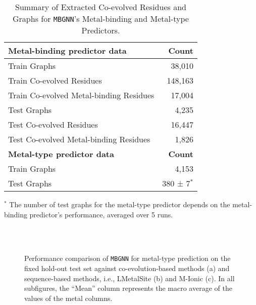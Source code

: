 \documentclass[letterpaper, 10 pt, conference]{ieeeconf}
\begin{document}
\begin{table}[ht]
\centering
\caption{Summary of Extracted Co-evolved Residues and Graphs for \texttt{MBGNN}'s Metal-binding and Metal-type Predictors.}
\renewcommand{\arraystretch}{1.3} %
\begin{tabular}{l r}
\hline
\textbf{Metal-binding predictor data} & \textbf{Count} \\ 
\hline
Train Graphs & 38,010 \\ 
Train Co-evolved Residues & 148,163 \\ 
Train Co-evolved Metal-binding Residues & 17,004 \\
Test Graphs & 4,235 \\
Test Co-evolved Residues & 16,447 \\
Test Co-evolved Metal-binding Residues & 1,826 \\
\hline
\textbf{Metal-type predictor data} & \textbf{Count} \\ 
\hline
Train Graphs & 4,153 \\
Test Graphs & 380 ± 7$^{*}$ \\
\hline
\end{tabular}
\label{tab:bin_graphs}

\vspace{0.5cm}
{\raggedright \footnotesize $^{*}$ The number of test graphs for the metal-type predictor depends on the metal-binding predictor's performance, averaged over 5 runs.\par}
\vspace{-5pt}
\end{table}

\begin{figure*}[t]
    \centering
    \\
    \\
    \caption{Performance comparison of \texttt{MBGNN} for metal-type prediction on the fixed hold-out test set against co-evolution-based methods (a) and sequence-based methods, i.e., LMetalSite (b) and M-Ionic (c). In all subfigures, the ``Mean'' column represents the macro average of the values of the metal columns.
    }
    \label{fig:allres}
\vspace{-5pt}
\end{figure*}
\end{document}
